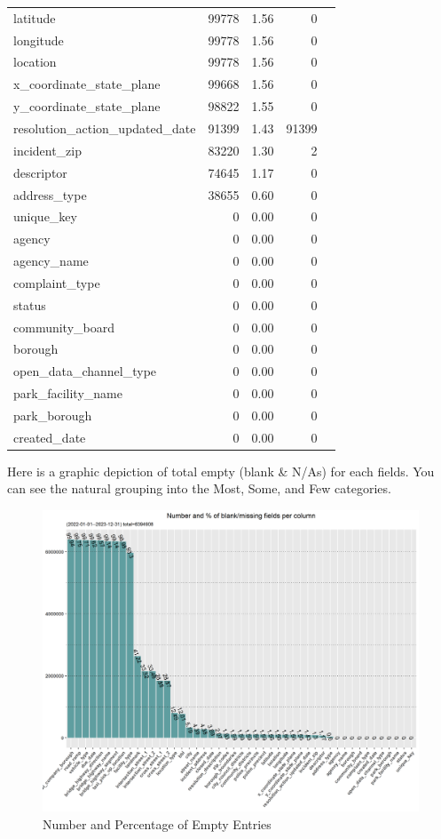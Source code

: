 \documentclass[12pt, titlepage]{article}
\begin{document}
\begin{table}[ht]
{\begin{tabular}{lrrrl}
		latitude & 99778 & 1.56 & 0 \\
		longitude & 99778 & 1.56 & 0 \\
		location & 99778 & 1.56 & 0 \\
		x\_coordinate\_state\_plane & 99668 & 1.56 & 0 \\
		y\_coordinate\_state\_plane & 98822 & 1.55 & 0 \\
		resolution\_action\_updated\_date & 91399 & 1.43 & 91399 \\
		incident\_zip & 83220 & 1.30 & 2 \\
		descriptor & 74645 & 1.17 & 0 \\
		address\_type & 38655 & 0.60 & 0 \\
		unique\_key & 0 & 0.00 & 0 \\
		agency & 0 & 0.00 & 0 \\
		agency\_name & 0 & 0.00 & 0 \\
		complaint\_type & 0 & 0.00 & 0 \\
		status & 0 & 0.00 & 0 \\
		community\_board & 0 & 0.00 & 0 \\
		borough & 0 & 0.00 & 0 \\
		open\_data\_channel\_type & 0 & 0.00 & 0 \\
		park\_facility\_name & 0 & 0.00 & 0 \\
		park\_borough & 0 & 0.00 & 0 \\
		created\_date & 0 & 0.00 & 0 \\
	\bottomrule
\end{tabular}
}
\end{table}

\FloatBarrier %

Here is a graphic depiction of total empty (blank \& N/As) for each fields. You can see the natural grouping into the Most, Some, and Few categories. 

\begin{figure}[H]
  \centering
	  \includegraphics[width=\textwidth]{BlankFields.png}
	  \caption{Number and Percentage of Empty Entries}
	  \label{fig:blank_fields}
\end{figure}
\end{document}
